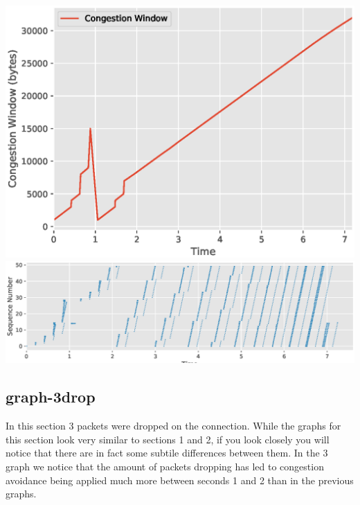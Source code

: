 \documentclass[a4paper,11pt]{article}
\begin{document}
\begin{center}
\includegraphics[width=\linewidth]{graphs-2drop/cwnd}
\includegraphics[width=\linewidth]{graphs-2drop/sequence}
\end{center}

\pagebreak

\subsection{graph-3drop}
In this section 3 packets were dropped on the connection. While the graphs for this section look very similar to sections 1 and 2, if you look closely you will notice that there are in fact some subtile differences between them. In the 3 graph we notice that the amount of packets dropping has led to congestion avoidance being applied much more between seconds 1 and 2 than in the previous graphs. 
\end{document}
